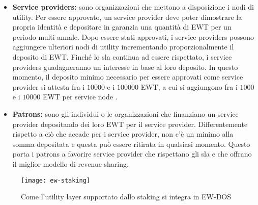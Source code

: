 \begin{itemize}
    \item \textbf{Service providers:} sono organizzazioni che mettono a disposizione i nodi di utility.
          Per essere approvato, un service provider deve poter dimostrare la propria identità e depositare in garanzia una quantità di EWT per un periodo multi-annale.
          Dopo essere stati approvati, i service providers possono aggiungere ulteriori nodi di utility incrementando proporzionalmente il deposito di EWT.
          Finché lo \gls{sla} continua ad essere rispettato, i service providers guadagneranno un interesse in base al loro deposito.
          In questo momento, il deposito minimo necessario per essere approvati come service provider si attesta fra i $10000$ e i $100000$ EWT, a cui si aggiungono fra i $1000$ e i $10000$ EWT per service node \cite{art:ew-staking}.
    \item \textbf{Patrons:} sono gli individui o le organizzazioni che finanziano un service provider depositando dei loro EWT per il service provider.
          Differentemente rispetto a ciò che accade per i service provider, non c'è un minimo alla somma depositata e questa può essere ritirata in qualsiasi momento.
          Questo porta i patrons a favorire service provider che rispettano gli \gls{sla} e che offrano il miglior modello di revenue-sharing.
\end{itemize}

\begin{figure}[h]
    \texttt{[image: ew-staking]}
    \centering
    \caption{Come l'utility layer supportato dallo staking si integra in EW-DOS \cite{art:ew-staking}}
    \label{lab:ew-staking}
\end{figure}